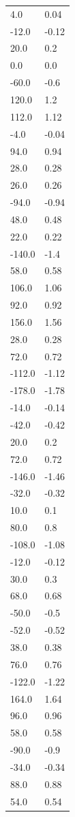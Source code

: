 \begin{longtable}{ll}
4.0 & 0.04 \\
-12.0 & -0.12 \\
20.0 & 0.2 \\
0.0 & 0.0 \\
-60.0 & -0.6 \\
120.0 & 1.2 \\
112.0 & 1.12 \\
-4.0 & -0.04 \\
94.0 & 0.94 \\
28.0 & 0.28 \\
26.0 & 0.26 \\
-94.0 & -0.94 \\
48.0 & 0.48 \\
22.0 & 0.22 \\
-140.0 & -1.4 \\
58.0 & 0.58 \\
106.0 & 1.06 \\
92.0 & 0.92 \\
156.0 & 1.56 \\
28.0 & 0.28 \\
72.0 & 0.72 \\
-112.0 & -1.12 \\
-178.0 & -1.78 \\
-14.0 & -0.14 \\
-42.0 & -0.42 \\
20.0 & 0.2 \\
72.0 & 0.72 \\
-146.0 & -1.46 \\
-32.0 & -0.32 \\
10.0 & 0.1 \\
80.0 & 0.8 \\
-108.0 & -1.08 \\
-12.0 & -0.12 \\
30.0 & 0.3 \\
68.0 & 0.68 \\
-50.0 & -0.5 \\
-52.0 & -0.52 \\
38.0 & 0.38 \\
76.0 & 0.76 \\
-122.0 & -1.22 \\
164.0 & 1.64 \\
96.0 & 0.96 \\
58.0 & 0.58 \\
-90.0 & -0.9 \\
-34.0 & -0.34 \\
88.0 & 0.88 \\
54.0 & 0.54 \\

\end{longtable}
